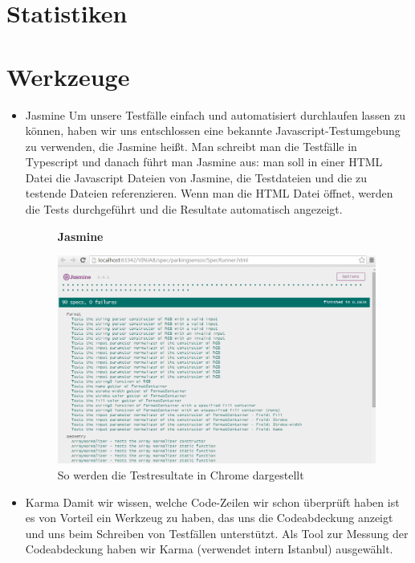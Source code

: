 \documentclass[qualitaetssicherung.tex]{subfiles}
\begin{document}
\section{Statistiken}\label{statistiken}
\section{Werkzeuge}\label{werkzeuge}
\begin{itemize}
	\item
	Jasmine\newline	
	Um unsere Testfälle einfach und automatisiert durchlaufen lassen zu können, haben wir uns entschlossen eine bekannte Javascript-Testumgebung zu verwenden, die Jasmine heißt. Man schreibt man die Testfälle in Typescript und danach führt man Jasmine aus: man soll in einer HTML Datei die Javascript Dateien von Jasmine, die Testdateien und die zu testende Dateien referenzieren. Wenn man die HTML Datei öffnet, werden die Tests durchgeführt und die Resultate automatisch angezeigt.
	
	\begin{figure}
    \textbf{Jasmine}\par\medskip
    \includegraphics[width=0.99\textwidth]{Images/jasmine-example.png}
    \caption{So werden die Testresultate in Chrome dargestellt}
	\end{figure}
	
	\item
	Karma\newline
	Damit wir wissen, welche Code-Zeilen wir schon überprüft haben ist es von Vorteil ein Werkzeug zu haben, das uns die Codeabdeckung anzeigt und uns beim Schreiben von Testfällen unterstützt. Als Tool zur Messung der Codeabdeckung haben wir Karma (verwendet intern Istanbul) ausgewählt.
	

\end{itemize}
\end{document}

